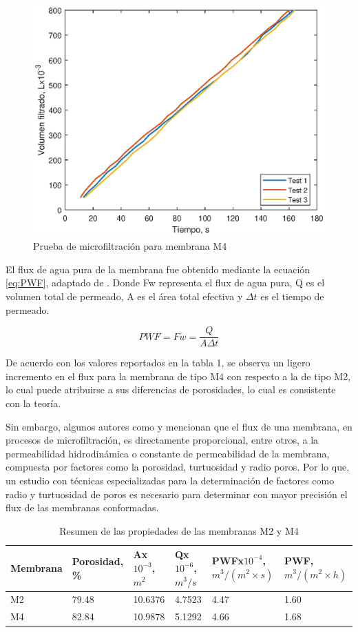 \documentclass{article}
\begin{document}
\begin{figure}[!htbp]
    \centering
    \includegraphics[width=0.7\linewidth]{Graphics/Z045_PWF_Test.eps}
    \caption{Prueba de microfiltración para membrana M4}
    \label{fig:PWF_M4}
\end{figure}

El flux de agua pura de la membrana fue obtenido mediante la ecuación \ref{eq:PWF}, adaptado de \textcite{Purkait2018}. 
Donde Fw representa el flux de agua pura, Q es el volumen total de permeado, A es el área total efectiva y $\Delta t$ es el tiempo de permeado. 

\begin{equation}
    PWF = Fw = \frac{Q}{A\Delta t}
    \label{eq:PWF}
\end{equation}

De acuerdo con los valores reportados en la tabla 1, se observa un ligero incremento en el 
flux para la membrana de tipo M4 con respecto a la de tipo M2, lo cual puede atribuirse a sus 
diferencias de porosidades, lo cual es consistente con la teoría. 

Sin embargo, algunos autores como \textcite{Drioli_Giorno_Macedonio_2019} y \textcite{Purkait2018} mencionan que el flux 
de una membrana, en procesos de microfiltración, es directamente proporcional, entre otros, a la 
permeabilidad hidrodinámica o constante de permeabilidad de la membrana, compuesta por factores como la porosidad, 
turtuosidad y radio poros. Por lo que, un estudio con técnicas especializadas para la determinación 
de factores como radio y turtuosidad de poros es necesario para determinar con mayor precisión el 
flux de las membranas conformadas. 

\begin{table}[!htbp]
\caption{Resumen de las propiedades de las membranas M2 y M4}
    \centering
    \begin{tabular}{p{2cm} p{2cm} p{2cm} p{2cm} p{2cm} p{2cm}}
        \toprule
        Membrana & Porosidad, \% & Ax$10^{-3}$, $m^2$ & Qx$10^{-6}$, $m^3/s$ & PWFx$10^{-4}$, $m^3/(m^2 \times s)$ & PWF, $m^3/(m^2 \times h)$ \\
        \midrule
        M2 & 79.48 & 10.6376 & 4.7523 & 4.47 & 1.60 \\
        M4 & 82.84 & 10.9878 & 5.1292 & 4.66 & 1.68 \\
        \bottomrule  
    \end{tabular}
    \label{tab:Props_M2_M4}
\end{table}
\end{document}
